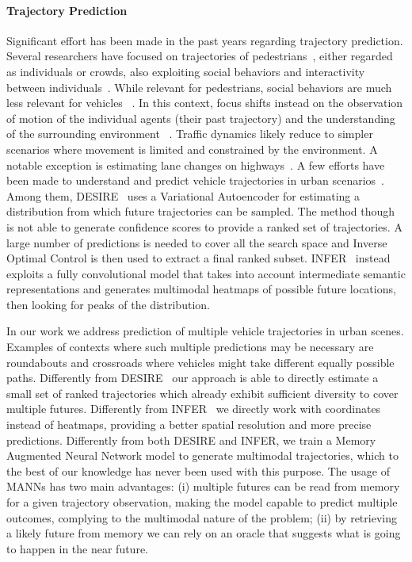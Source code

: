 \documentclass[10pt,twocolumn,letterpaper]{article}
\begin{document}
\paragraph{Trajectory Prediction}
Significant effort has been made in the past years regarding trajectory prediction.
Several researchers have focused on trajectories of pedestrians~\cite{helbing1995social, pellegrini2009you, alahi2016social, gupta2018social, sadeghian2019sophie}, either regarded as individuals or crowds, also exploiting social behaviors and interactivity between individuals~\cite{helbing1995social, pellegrini2009you, alahi2016social,gupta2018social, lisotto2019social}.
While relevant for pedestrians, social behaviors are much less relevant for vehicles ~\cite{lee2017desire}. In this context, focus shifts instead on the observation of motion of the individual agents (their past trajectory) and the understanding of the surrounding environment ~\cite{lee2017desire, srikanth2019infer}. Traffic dynamics likely reduce to simpler scenarios where movement is limited and constrained by the environment. A notable exception is estimating lane changes on highways~\cite{kuefler2017imitating, deo2018multi}.
A few efforts have been made to understand and predict vehicle trajectories in urban scenarios~\cite{lee2017desire, srikanth2019infer, zyner2019naturalistic, ma2019trafficpredict}.
Among them, DESIRE~\cite{lee2017desire} uses a Variational Autoencoder for estimating a distribution from which future trajectories can be sampled. The method though is not able to generate confidence scores to provide a ranked set of trajectories. A large number of predictions is needed to cover all the search space and Inverse Optimal Control is then used to extract a final ranked subset. INFER~\cite{srikanth2019infer} instead exploits a fully convolutional model that takes into account intermediate semantic representations and generates multimodal heatmaps of possible future locations, then looking for peaks of the distribution.


In our work we address prediction of multiple vehicle trajectories in urban scenes. Examples of contexts where such multiple predictions may be necessary are roundabouts and crossroads where vehicles might take different equally possible paths. Differently from DESIRE~\cite{lee2017desire} our approach is able to directly estimate a small set of ranked trajectories which already exhibit sufficient diversity to cover multiple futures. Differently from INFER~\cite{srikanth2019infer} we directly work with coordinates instead of heatmaps, providing a better spatial resolution and more precise predictions.
Differently from both DESIRE and INFER, we train a Memory Augmented Neural Network model to generate multimodal trajectories, which to the best of our knowledge has never been used with this purpose. The usage of MANNs has two main advantages: (i) multiple futures can be read from memory for a given trajectory observation, making the model capable to predict multiple outcomes, complying to the multimodal nature of the problem; (ii) by retrieving a likely future from memory we can rely on an oracle that suggests what is going to happen in the near future.
\end{document}
